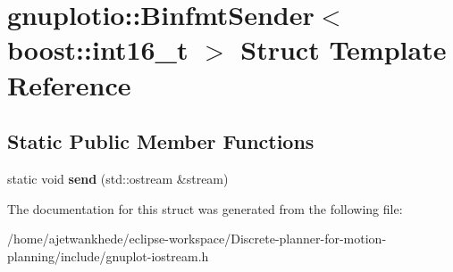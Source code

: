 \hypertarget{structgnuplotio_1_1BinfmtSender_3_01boost_1_1int16__t_01_4}{}\section{gnuplotio\+:\+:Binfmt\+Sender$<$ boost\+:\+:int16\+\_\+t $>$ Struct Template Reference}
\label{structgnuplotio_1_1BinfmtSender_3_01boost_1_1int16__t_01_4}
\subsection*{Static Public Member Functions}
\begin{DoxyCompactItemize}
\item 
\mbox{\label{structgnuplotio_1_1BinfmtSender_3_01boost_1_1int16__t_01_4_a6d3c1b829c9196fa9d1f53bd78a90e34}} 
static void {\bfseries send} (std\+::ostream \&stream)
\end{DoxyCompactItemize}


The documentation for this struct was generated from the following file\+:\begin{DoxyCompactItemize}
\item 
/home/ajetwankhede/eclipse-\/workspace/\+Discrete-\/planner-\/for-\/motion-\/planning/include/gnuplot-\/iostream.\+h\end{DoxyCompactItemize}
